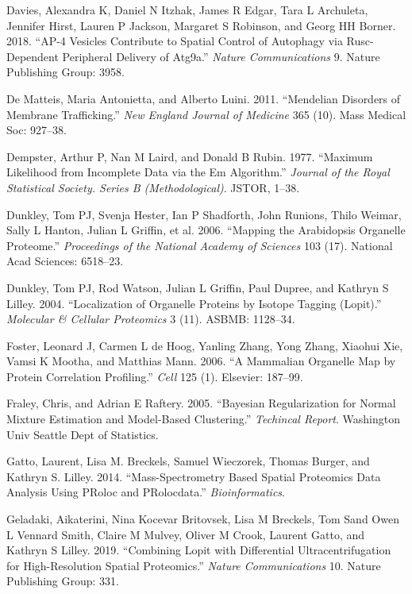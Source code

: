 \documentclass[]{article}
\begin{document}
\hypertarget{ref-Davies:2018}{}
Davies, Alexandra K, Daniel N Itzhak, James R Edgar, Tara L Archuleta,
Jennifer Hirst, Lauren P Jackson, Margaret S Robinson, and Georg HH
Borner. 2018. ``AP-4 Vesicles Contribute to Spatial Control of Autophagy
via Rusc-Dependent Peripheral Delivery of Atg9a.'' \emph{Nature
Communications} 9. Nature Publishing Group: 3958.

\hypertarget{ref-De:2011}{}
De Matteis, Maria Antonietta, and Alberto Luini. 2011. ``Mendelian
Disorders of Membrane Trafficking.'' \emph{New England Journal of
Medicine} 365 (10). Mass Medical Soc: 927--38.

\hypertarget{ref-EM:1977}{}
Dempster, Arthur P, Nan M Laird, and Donald B Rubin. 1977. ``Maximum
Likelihood from Incomplete Data via the Em Algorithm.'' \emph{Journal of
the Royal Statistical Society. Series B (Methodological)}. JSTOR, 1--38.

\hypertarget{ref-Dunkley:2006}{}
Dunkley, Tom PJ, Svenja Hester, Ian P Shadforth, John Runions, Thilo
Weimar, Sally L Hanton, Julian L Griffin, et al. 2006. ``Mapping the
Arabidopsis Organelle Proteome.'' \emph{Proceedings of the National
Academy of Sciences} 103 (17). National Acad Sciences: 6518--23.

\hypertarget{ref-Dunkley:2004}{}
Dunkley, Tom PJ, Rod Watson, Julian L Griffin, Paul Dupree, and Kathryn
S Lilley. 2004. ``Localization of Organelle Proteins by Isotope Tagging
(Lopit).'' \emph{Molecular \& Cellular Proteomics} 3 (11). ASBMB:
1128--34.

\hypertarget{ref-Foster:2006}{}
Foster, Leonard J, Carmen L de Hoog, Yanling Zhang, Yong Zhang, Xiaohui
Xie, Vamsi K Mootha, and Matthias Mann. 2006. ``A Mammalian Organelle
Map by Protein Correlation Profiling.'' \emph{Cell} 125 (1). Elsevier:
187--99.

\hypertarget{ref-Fraley:2005}{}
Fraley, Chris, and Adrian E Raftery. 2005. ``Bayesian Regularization for
Normal Mixture Estimation and Model-Based Clustering.'' \emph{Techincal
Report}. Washington Univ Seattle Dept of Statistics.

\hypertarget{ref-pRoloc:2014}{}
Gatto, Laurent, Lisa M. Breckels, Samuel Wieczorek, Thomas Burger, and
Kathryn S. Lilley. 2014. ``Mass-Spectrometry Based Spatial Proteomics
Data Analysis Using PRoloc and PRolocdata.'' \emph{Bioinformatics}.

\hypertarget{ref-DC:2018}{}
Geladaki, Aikaterini, Nina Kocevar Britovsek, Lisa M Breckels, Tom Sand
Owen L Vennard Smith, Claire M Mulvey, Oliver M Crook, Laurent Gatto,
and Kathryn S Lilley. 2019. ``Combining Lopit with Differential
Ultracentrifugation for High-Resolution Spatial Proteomics.''
\emph{Nature Communications} 10. Nature Publishing Group: 331.
\end{document}
